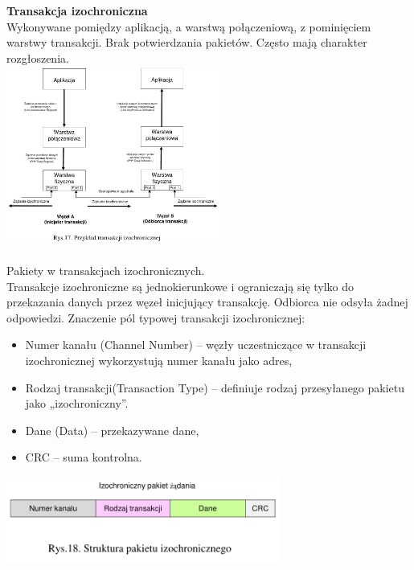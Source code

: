 	\textbf{Transakcja izochroniczna}\\
	Wykonywane pomiędzy aplikacją, a warstwą połączeniową, z pominięciem warstwy transakcji. Brak potwierdzania pakietów. Często mają charakter rozgłoszenia.\\
	\includegraphics[width=7cm]{./wyklady/FIREWIRE_19_1.pdf}\\\\
	Pakiety w transakcjach izochronicznych.\\
	Transakcje izochroniczne są jednokierunkowe i ograniczają się tylko do przekazania danych przez węzeł inicjujący transakcję. Odbiorca nie odsyła żadnej odpowiedzi. Znaczenie pól typowej transakcji izochronicznej:
	\begin{itemize}
		\item Numer kanału (Channel Number) – węzły uczestniczące w transakcji izochronicznej wykorzystują numer kanału jako adres,
		\item Rodzaj transakcji(Transaction Type) – definiuje rodzaj przesyłanego pakietu jako „izochroniczny”.
		\item Dane (Data) – przekazywane dane,
		\item CRC – suma kontrolna.
	\end{itemize}
	\includegraphics[width=9cm]{./wyklady/FIREWIRE_20_1.pdf}
	
	
